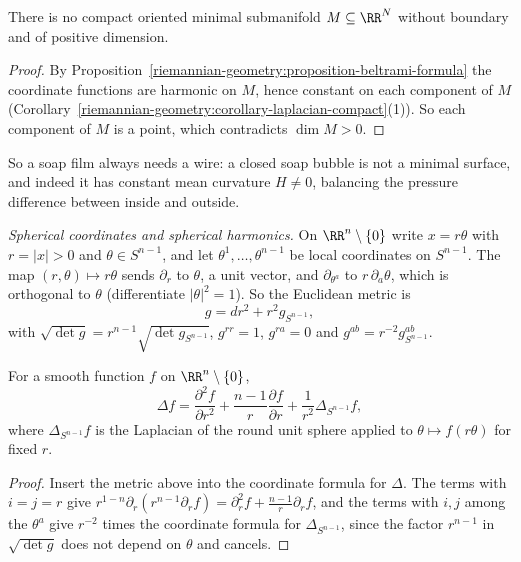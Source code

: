 \begin{corollary}\label{riemannian-geometry:corollary-no-compact-minimal}
There is no compact oriented minimal submanifold $M \subseteq \RR^N$ without boundary and of positive dimension.
\end{corollary}

\begin{proof}
By Proposition~\ref{riemannian-geometry:proposition-beltrami-formula} the coordinate functions are harmonic on $M$, hence constant on each component of $M$
(Corollary~\ref{riemannian-geometry:corollary-laplacian-compact}(1)). So each component of $M$ is a point, which contradicts $\dim M > 0$.
\end{proof}

So a soap film always needs a wire: a closed soap bubble is not a minimal surface, and indeed it has constant mean curvature $H \neq 0$, balancing the pressure difference
between inside and outside.

\emph{Spherical coordinates and spherical harmonics.} On $\RR^n \setminus \{0\}$ write $x = r\theta$ with $r = |x| > 0$ and $\theta \in S^{n-1}$, and let $\theta^1, \ldots, \theta^{n-1}$ be local
coordinates on $S^{n-1}$. The map $(r, \theta) \mapsto r\theta$ sends $\partial_r$ to $\theta$, a unit vector, and $\partial_{\theta^a}$ to $r\,\partial_a\theta$, which is orthogonal to $\theta$
(differentiate $|\theta|^2 = 1$). So the Euclidean metric is
\[
g = dr^2 + r^2g_{S^{n-1}},
\]
with $\sqrt{\det g} = r^{n-1}\sqrt{\det g_{S^{n-1}}}$, $g^{rr} = 1$, $g^{ra} = 0$ and $g^{ab} = r^{-2}g_{S^{n-1}}^{ab}$.

\begin{proposition}\label{riemannian-geometry:proposition-laplacian-polar}
For a smooth function $f$ on $\RR^n \setminus \{0\}$,
\[
\Delta f = \frac{\partial^2f}{\partial r^2} + \frac{n-1}{r}\frac{\partial f}{\partial r} + \frac{1}{r^2}\Delta_{S^{n-1}}f,
\]
where $\Delta_{S^{n-1}}f$ is the Laplacian of the round unit sphere applied to $\theta \mapsto f(r\theta)$ for fixed $r$.
\end{proposition}

\begin{proof}
Insert the metric above into the coordinate formula for $\Delta$. The terms with $i = j = r$ give $r^{1-n}\partial_r(r^{n-1}\partial_rf) = \partial_r^2f + \frac{n-1}r\partial_rf$, and the terms with
$i, j$ among the $\theta^a$ give $r^{-2}$ times the coordinate formula for $\Delta_{S^{n-1}}$, since the factor $r^{n-1}$ in $\sqrt{\det g}$ does not depend on $\theta$ and cancels.
\end{proof}

